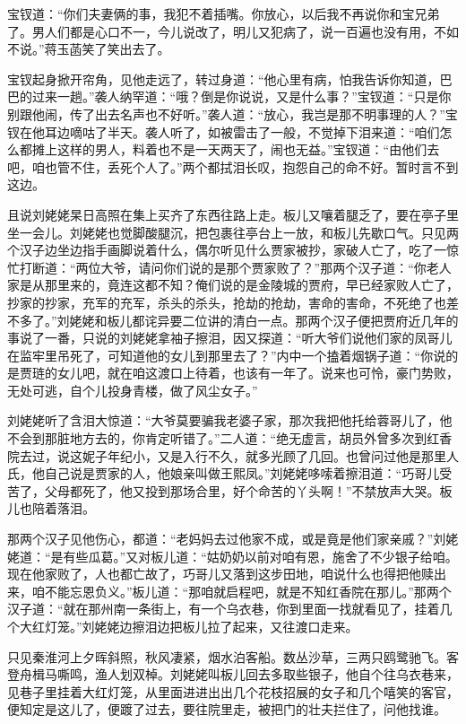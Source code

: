 \documentclass[12pt,oneside]{book}
\begin{document}
宝钗道：“你们夫妻俩的事，我犯不着插嘴。你放心，以后我不再说你和宝兄弟了。男人们都是心口不一，今儿说改了，明儿又犯病了，说一百遍也没有用，不如不说。”蒋玉菡笑了笑出去了。

宝钗起身掀开帘角，见他走远了，转过身道：“他心里有病，怕我告诉你知道，巴巴的过来一趟。”袭人纳罕道：“哦？倒是你说说，又是什么事？”宝钗道：“只是你别跟他闹，传了出去名声也不好听。”袭人道：“放心，我岂是那不明事理的人？”宝钗在他耳边嘀咕了半天。袭人听了，如被雷击了一般，不觉掉下泪来道：“咱们怎么都摊上这样的男人，料着也不是一天两天了，闹也无益。”宝钗道：“由他们去吧，咱也管不住，丢死个人了。”两个都拭泪长叹，抱怨自己的命不好。暂时言不到这边。

且说刘姥姥杲日高照在集上买齐了东西往路上走。板儿又嚷着腿乏了，要在亭子里坐一会儿。刘姥姥也觉脚酸腿沉，把包裹往亭台上一放，和板儿先歇口气。只见两个汉子边坐边指手画脚说着什么，偶尔听见什么贾家被抄，家破人亡了，吃了一惊忙打断道：“两位大爷，请问你们说的是那个贾家败了？”那两个汉子道：“你老人家是从那里来的，竟连这都不知？俺们说的是金陵城的贾府，早已经家败人亡了，抄家的抄家，充军的充军，杀头的杀头，抢劫的抢劫，害命的害命，不死绝了也差不多了。”刘姥姥和板儿都诧异要二位讲的清白一点。那两个汉子便把贾府近几年的事说了一番，只说的刘姥姥拿袖子擦泪，因又探道：“听大爷们说他们家的凤哥儿在监牢里吊死了，可知道他的女儿到那里去了？”内中一个搕着烟锅子道：“你说的是贾琏的女儿吧，就在咱这渡口上待着，也该有一年了。说来也可怜，豪门势败，无处可逃，自个儿投身青楼，做了风尘女子。”

刘姥姥听了含泪大惊道：“大爷莫要骗我老婆子家，那次我把他托给蓉哥儿了，他不会到那脏地方去的，你肯定听错了。”二人道：“绝无虚言，胡员外曾多次到红香院去过，说这妮子年纪小，又是入行不久，就多光顾了几回。也曾问过他是那里人氏，他自己说是贾家的人，他娘亲叫做王熙凤。”刘姥姥哆嗦着擦泪道：“巧哥儿受苦了，父母都死了，他又投到那场合里，好个命苦的丫头啊！”不禁放声大哭。板儿也陪着落泪。

那两个汉子见他伤心，都道：“老妈妈去过他家不成，或是竟是他们家亲戚？”刘姥姥道：“是有些瓜葛。”又对板儿道：“姑奶奶以前对咱有恩，施舍了不少银子给咱。现在他家败了，人也都亡故了，巧哥儿又落到这步田地，咱说什么也得把他赎出来，咱不能忘恩负义。”板儿道：“那咱就启程吧，就是不知红香院在那儿。”那两个汉子道：“就在那州南一条街上，有一个乌衣巷，你到里面一找就看见了，挂着几个大红灯笼。”刘姥姥边擦泪边把板儿拉了起来，又往渡口走来。

只见秦淮河上夕晖斜照，秋风凄紧，烟水泊客船。数丛沙草，三两只鸥鹭驰飞。客登舟楫马嘶鸣，渔人划双棹。刘姥姥叫板儿回去多取些银子，他自个往乌衣巷来，见巷子里挂着大红灯笼，从里面进进出出几个花枝招展的女子和几个嘻笑的客官，便知定是这儿了，便踱了过去，要往院里走，被把门的壮夫拦住了，问他找谁。
\end{document}
